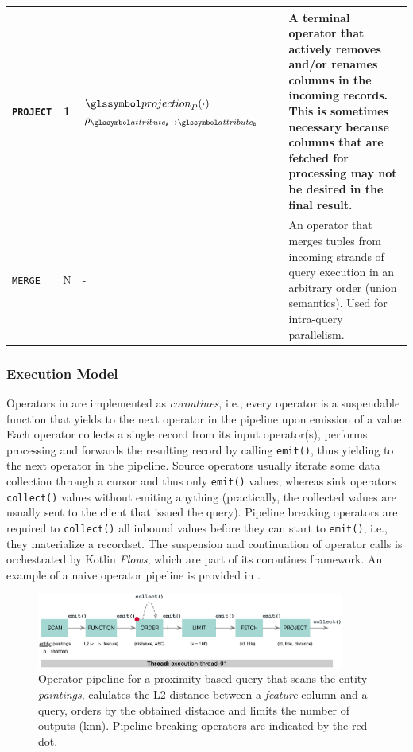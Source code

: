 \begin{table}
\begin{tabular}{| l || c | p{30mm}  | c | p{70mm} |}
        \hline
        \texttt{PROJECT} & 1 & $\projection_{P}(\cdot)$ \newline $\rho_{\attribute_\mathtt{A} \rightarrow \attribute_\mathtt{B}}$ & & A terminal operator that actively removes and/or renames columns in the incoming records. This is sometimes necessary because columns that are fetched for processing may not be desired in the final result. \\ 
        \hline
        \texttt{MERGE} & N & - & & An operator that merges tuples from incoming strands of query execution in an arbitrary order (union semantics). Used for intra-query parallelism. \\ 
        \hline
        \hline
    \end{tabular}  
\end{table}

\subsubsection{Execution Model}

Operators in \cottontail{} are implemented as \emph{coroutines}, i.e., every operator is a suspendable function that yields to the next operator in the pipeline upon emission of a value. Each operator collects a single record from its input operator(s), performs processing and forwards the resulting record by calling \texttt{emit()}, thus yielding to the next operator in the pipeline. Source operators usually iterate some data collection through a cursor and thus only \texttt{emit()} values, whereas sink operators \texttt{collect()} values without emiting anything (practically, the collected values are usually sent to the client that issued the query). Pipeline breaking operators are required to \texttt{collect()} all inbound values before they can start to \texttt{emit()}, i.e., they materialize a recordset. The suspension and continuation of operator calls is orchestrated by Kotlin \emph{Flows}, which are part of its coroutines framework. An example of a naive operator pipeline is provided in . 

\begin{figure}[bt]
    \centering
    \includegraphics[width=0.9\textwidth]{figures/execution-model-simple}
    \caption{Operator pipeline for a proximity based query that scans the entity \emph{paintings}, calulates the L2 distance between a \emph{feature} column and a query, orders by the obtained distance and limits the number of outputs (\acrshort{knn}). Pipeline breaking operators are indicated by the red dot.}
    \label{figure:cottontail_execution_model_simple}
\end{figure}

